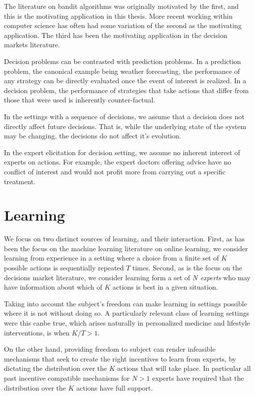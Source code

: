 The literature on bandit algorithms was originally motivated by the first, and this is the motivating application in this thesis. More recent working within computer science has often had some variation of the second as the motivating application. The third has been the motivating application in the decision markets literature.

Decision problems can be contrasted with prediction problems.
In a prediction problem, the canonical example being weather forecasting, the performance of any strategy can be directly evaluated once the event of interest is realized.
In a decision problem, the performance of strategies that take actions that differ from those that were used is inherently counter-factual.

In the settings with a sequence of decisions,  we assume that a decision does not directly affect  future decisions. That is, while the underlying state of the system may be changing, the decisions do not affect it's evolution.

In the expert elicitation for decision setting, we assume no inherent interest of experts on actions. For example, the expert doctors offering advice have no conflict of interest and would not profit more from carrying out a specific treatment.

\section{Learning}

We focus on two distinct sources of learning, and their interaction.
First, as has been the focus on the machine learning literature on online learning, we consider learning from experience in a setting where a choice from a finite set of $K$ possible actions is sequentially repeated $T$ times.
Second, as is the focus on the decisions market literature, we consider learning form a set of $N$ \emph{experts} who may have information about which of $K$ actions is best in a given situation.

Taking into account the subject's freedom can make learning in settings possible where it is not without doing so.
A particularly relevant class of learning settings were this canbe true, which arises naturally in personalized medicine and lifestyle interventions, is when $K/T > 1$.

On the other hand, providing freedom to subject can render infeasible mechanisms that seek to create the right incentives to learn from experts, by dictating the distribution over the $K$ actions that will take place.
In particular all past incentive compatible mechanisms for $N>1$ experts have required that the distribution over the $K$ actions have full support.


